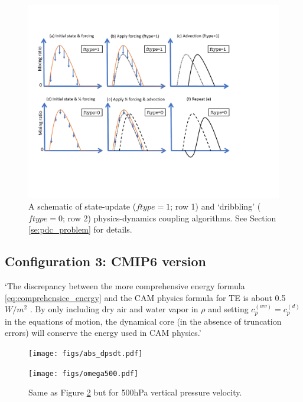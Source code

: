 \documentclass{agujournal}
\begin{document}
 \begin{figure}[h]
 \centering
 \includegraphics[width=35pc]{figs/ftype_schematic.pdf}
 \caption{A schematic of state-update ($ftype=1$; row 1) and `dribbling' ($ftype=0$; row 2) physics-dynamics coupling algorithms. See Section \ref{se:pdc_problem} for details.}
 \label{fig:ftype_schematic}
  \end{figure}

\subsection{Configuration 3: CMIP6 version}
`The discrepancy between the more comprehensive energy formula \eqref{eq:comprehensice_energy} and the CAM physics formula for TE is about 0.5 $W/m^2$ \citep{T2011LNCSEb}. By only including dry air and water vapor   in $\rho$ and setting $c_p^{(wv)}= c_p^{(d)}$ in the equations of motion, the dynamical core (in the absence of truncation errors) will conserve the energy used in CAM physics.'


 \begin{figure}[h]
 \centering
 \texttt{[image: figs/abs\_dpsdt.pdf]}
 \caption{}
 \label{fig:abs_dpsdt}
  \end{figure}


 \begin{figure}[h]
 \centering
 \texttt{[image: figs/omega500.pdf]}
 \caption{Same as Figure \ref{fig:abs_dpsdt} but for 500hPa vertical pressure velocity.}
 \label{fig:omega500}
  \end{figure}
\end{document}

